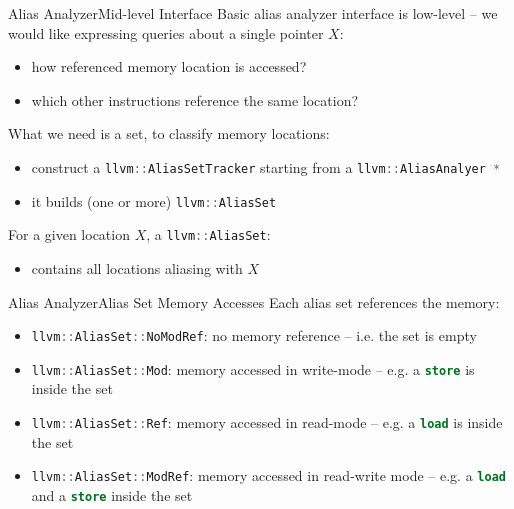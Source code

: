 \documentclass[10pt,mathserif]{beamer}
\newcommand{\cppinline}[1]{\lstinline[language=C++]!#1!}
\newcommand{\llvminline}[1]{\lstinline[language=LLVM]!#1!}
\begin{document}
\begin{frame}{Alias Analyzer}{Mid-level Interface}
Basic alias analyzer interface is low-level -- we would like expressing queries
about a single pointer $X$:

\begin{itemize}
\item how referenced memory location is accessed?
\item which other instructions reference the same location?
\end{itemize}

\vfill
What we need is a set, to classify memory locations:

\begin{itemize}
\item construct a \cppinline{llvm::AliasSetTracker} starting from a
      \cppinline{llvm::AliasAnalyer *}
\item it builds (one or more) \cppinline{llvm::AliasSet}
\end{itemize}

\vfill
For a given location $X$, a \cppinline{llvm::AliasSet}:

\begin{itemize}
\item contains all locations aliasing with $X$
\end{itemize}
\end{frame}

\begin{frame}{Alias Analyzer}{Alias Set Memory Accesses}
Each alias set \alert{references} the memory:

\vfill
\begin{itemize}
\item \cppinline{llvm::AliasSet::NoModRef}: no memory reference -- i.e. the set
      is empty
\vfill
\item \cppinline{llvm::AliasSet::Mod}: memory accessed in write-mode -- e.g. a
      \llvminline{store} is inside the set
\vfill
\item \cppinline{llvm::AliasSet::Ref}: memory accessed in read-mode -- e.g. a
      \llvminline{load} is inside the set
\vfill
\item \cppinline{llvm::AliasSet::ModRef}: memory accessed in read-write mode --
      e.g. a \llvminline{load} and a \llvminline{store} inside the set
\vfill
\end{itemize}
\end{frame}
\end{document}
